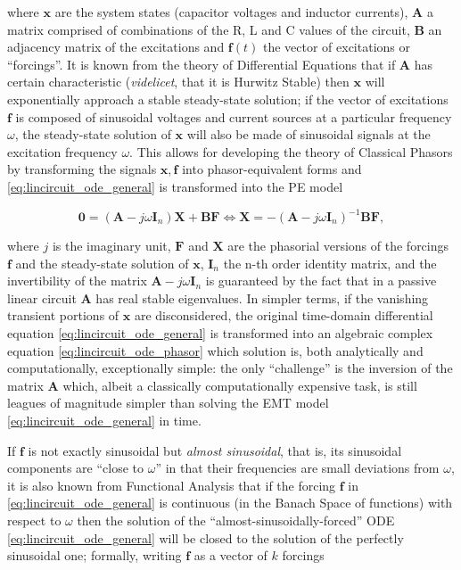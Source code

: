 	\noindent where $\mathbf{x}$ are the system states (capacitor voltages and inductor currents), $\mathbf{A}$ a matrix comprised of combinations of the R, L and C values of the circuit, $\mathbf{B}$ an adjacency matrix of the excitations and $\mathbf{f}(t)$ the vector of excitations or ``forcings''. It is known from the theory of Differential Equations that if $\mathbf{A}$ has certain characteristic (\textit{videlicet}, that it is Hurwitz Stable) then $\mathbf{x}$ will exponentially approach a stable steady-state solution; if the vector of excitations $\mathbf{f}$ is composed of sinusoidal voltages and current sources at a particular frequency $\omega$, the steady-state solution of $\mathbf{x}$ will also be made of sinusoidal signals at the excitation frequency $\omega$. This allows for developing the theory of Classical Phasors by transforming the signals $\mathbf{x,f}$ into phasor-equivalent forms and \eqref{eq:lincircuit_ode_general} is transformed into the PE model

\begin{equation} \mathbf{0} = \left(\mathbf{A} - j\omega\mathbf{I}_n \right)\mathbf{X + BF} \Leftrightarrow \mathbf{X} = -\left(\mathbf{A} - j\omega\mathbf{I}_n \right)^{-1}\mathbf{BF}, \label{eq:lincircuit_ode_phasor}\end{equation}

	\noindent where $j$ is the imaginary unit, $\mathbf{F}$ and $\mathbf{X}$ are the phasorial versions of the forcings $\mathbf{f}$ and the steady-state solution of $\mathbf{x}$, $\mathbf{I}_n$ the n-th order identity matrix, and the invertibility of the matrix $\mathbf{A} - j\omega\mathbf{I}_n$ is guaranteed by the fact that in a passive linear circuit $\mathbf{A}$ has real stable eigenvalues. In simpler terms, if the vanishing transient portions of $\mathbf{x}$ are disconsidered, the original time-domain differential equation \eqref{eq:lincircuit_ode_general} is transformed into an algebraic complex equation \eqref{eq:lincircuit_ode_phasor} which solution is, both analytically and computationally, exceptionally simple: the only ``challenge'' is the inversion of the matrix $\mathbf{A}$ which, albeit a classically computationally expensive task, is still leagues of magnitude simpler than solving the EMT model \eqref{eq:lincircuit_ode_general} in time.

	If $\mathbf{f}$ is not exactly sinusoidal but \textit{almost sinusoidal}, that is, its sinusoidal components are ``close to $\omega$'' in that their frequencies are small deviations from $\omega$, it is also known from Functional Analysis that if the forcing $\mathbf{f}$ in \eqref{eq:lincircuit_ode_general} is continuous (in the Banach Space of functions) with respect to $\omega$  then the solution of the ``almost-sinusoidally-forced'' ODE \eqref{eq:lincircuit_ode_general} will be closed to the solution of the perfectly sinusoidal one; formally, writing $\mathbf{f}$ as a vector of $k$ forcings


